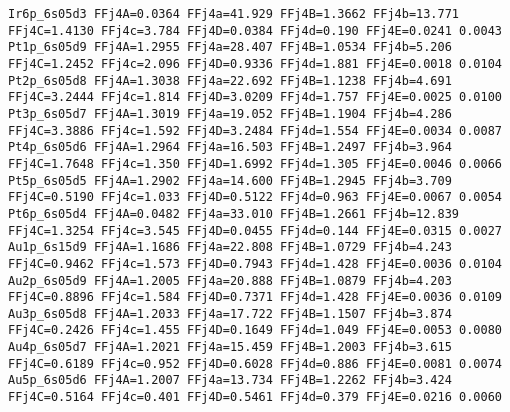 {\begin{verbatim}
Ir6p_6s05d3 FFj4A=0.0364 FFj4a=41.929 FFj4B=1.3662 FFj4b=13.771 FFj4C=1.4130 FFj4c=3.784 FFj4D=0.0384 FFj4d=0.190 FFj4E=0.0241 0.0043 
Pt1p_6s05d9 FFj4A=1.2955 FFj4a=28.407 FFj4B=1.0534 FFj4b=5.206 FFj4C=1.2452 FFj4c=2.096 FFj4D=0.9336 FFj4d=1.881 FFj4E=0.0018 0.0104 
Pt2p_6s05d8 FFj4A=1.3038 FFj4a=22.692 FFj4B=1.1238 FFj4b=4.691 FFj4C=3.2444 FFj4c=1.814 FFj4D=3.0209 FFj4d=1.757 FFj4E=0.0025 0.0100 
Pt3p_6s05d7 FFj4A=1.3019 FFj4a=19.052 FFj4B=1.1904 FFj4b=4.286 FFj4C=3.3886 FFj4c=1.592 FFj4D=3.2484 FFj4d=1.554 FFj4E=0.0034 0.0087 
Pt4p_6s05d6 FFj4A=1.2964 FFj4a=16.503 FFj4B=1.2497 FFj4b=3.964 FFj4C=1.7648 FFj4c=1.350 FFj4D=1.6992 FFj4d=1.305 FFj4E=0.0046 0.0066 
Pt5p_6s05d5 FFj4A=1.2902 FFj4a=14.600 FFj4B=1.2945 FFj4b=3.709 FFj4C=0.5190 FFj4c=1.033 FFj4D=0.5122 FFj4d=0.963 FFj4E=0.0067 0.0054 
Pt6p_6s05d4 FFj4A=0.0482 FFj4a=33.010 FFj4B=1.2661 FFj4b=12.839 FFj4C=1.3254 FFj4c=3.545 FFj4D=0.0455 FFj4d=0.144 FFj4E=0.0315 0.0027 
Au1p_6s15d9 FFj4A=1.1686 FFj4a=22.808 FFj4B=1.0729 FFj4b=4.243 FFj4C=0.9462 FFj4c=1.573 FFj4D=0.7943 FFj4d=1.428 FFj4E=0.0036 0.0104 
Au2p_6s05d9 FFj4A=1.2005 FFj4a=20.888 FFj4B=1.0879 FFj4b=4.203 FFj4C=0.8896 FFj4c=1.584 FFj4D=0.7371 FFj4d=1.428 FFj4E=0.0036 0.0109 
Au3p_6s05d8 FFj4A=1.2033 FFj4a=17.722 FFj4B=1.1507 FFj4b=3.874 FFj4C=0.2426 FFj4c=1.455 FFj4D=0.1649 FFj4d=1.049 FFj4E=0.0053 0.0080 
Au4p_6s05d7 FFj4A=1.2021 FFj4a=15.459 FFj4B=1.2003 FFj4b=3.615 FFj4C=0.6189 FFj4c=0.952 FFj4D=0.6028 FFj4d=0.886 FFj4E=0.0081 0.0074 
Au5p_6s05d6 FFj4A=1.2007 FFj4a=13.734 FFj4B=1.2262 FFj4b=3.424 FFj4C=0.5164 FFj4c=0.401 FFj4D=0.5461 FFj4d=0.379 FFj4E=0.0216 0.0060 

\end{verbatim}
}
